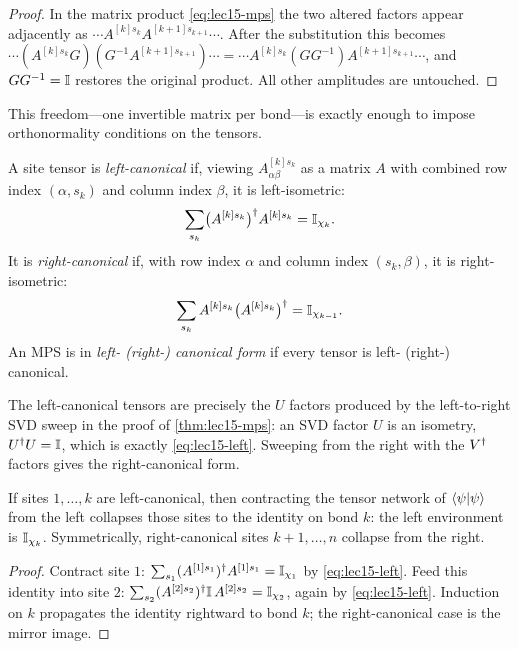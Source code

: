 \begin{proof}
In the matrix product \eqref{eq:lec15-mps} the two altered factors appear
adjacently as $\cdots A^{[k]s_k}A^{[k+1]s_{k+1}}\cdots$. After the substitution
this becomes $\cdots (A^{[k]s_k}G)(G^{-1}A^{[k+1]s_{k+1}})\cdots
=\cdots A^{[k]s_k}(GG^{-1})A^{[k+1]s_{k+1}}\cdots$, and $GG^{-1}=\mathbb{I}$ restores the
original product. All other amplitudes are untouched.
\end{proof}

This freedom---one invertible matrix per bond---is exactly enough to impose
orthonormality conditions on the tensors.

\begin{definition}\label{def:lec15-canonical}
A site tensor is \emph{left-canonical} if, viewing $A^{[k]s_k}_{\alpha\beta}$ as a
matrix $A$ with combined row index $(\alpha,s_k)$ and column index $\beta$, it is
left-isometric:
\begin{equation}\label{eq:lec15-left}
  \sum_{s_k}\bigl(A^{[k]s_k}\bigr)^{\dagger} A^{[k]s_k}=\mathbb{I}_{\chi_k}.
\end{equation}
It is \emph{right-canonical} if, with row index $\alpha$ and column index
$(s_k,\beta)$, it is right-isometric:
\begin{equation}\label{eq:lec15-right}
  \sum_{s_k}A^{[k]s_k}\bigl(A^{[k]s_k}\bigr)^{\dagger}=\mathbb{I}_{\chi_{k-1}}.
\end{equation}
An MPS is in \emph{left- (right-) canonical form} if every tensor is left-
(right-) canonical.
\end{definition}

The left-canonical tensors are precisely the $U$ factors produced by the
left-to-right SVD sweep in the proof of \cref{thm:lec15-mps}: an SVD factor $U$
is an isometry, $U^{\dagger} U=\mathbb{I}$, which is exactly \eqref{eq:lec15-left}. Sweeping
from the right with the $V^{\dagger}$ factors gives the right-canonical form.

\begin{proposition}\label{prop:lec15-triangle}
If sites $1,\dots,k$ are left-canonical, then contracting the tensor network of
$\braket{\psi|\psi}$ from the left collapses those sites to the identity on bond
$k$: the left environment is $\mathbb{I}_{\chi_k}$. Symmetrically, right-canonical sites
$k+1,\dots,n$ collapse from the right.
\end{proposition}

\begin{proof}
Contract site $1$: $\sum_{s_1}(A^{[1]s_1})^{\dagger} A^{[1]s_1}=\mathbb{I}_{\chi_1}$ by
\eqref{eq:lec15-left}. Feed this identity into site $2$:
$\sum_{s_2}(A^{[2]s_2})^{\dagger}\mathbb{I}\,A^{[2]s_2}=\mathbb{I}_{\chi_2}$, again by
\eqref{eq:lec15-left}. Induction on $k$ propagates the identity rightward to bond
$k$; the right-canonical case is the mirror image.
\end{proof}

